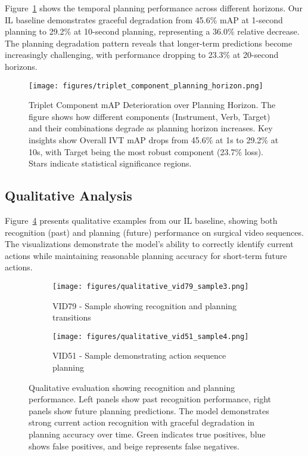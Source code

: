 \documentclass[runningheads]{llncs}
\begin{document}
Figure~\ref{fig:planning_analysis} shows the temporal planning performance across different horizons. Our IL baseline demonstrates graceful degradation from 45.6\% mAP at 1-second planning to 29.2\% at 10-second planning, representing a 36.0\% relative decrease. The planning degradation pattern reveals that longer-term predictions become increasingly challenging, with performance dropping to 23.3\% at 20-second horizons.

\begin{figure}[h]
\centering
\texttt{[image: figures/triplet\_component\_planning\_horizon.png]}
\caption{Triplet Component mAP Deterioration over Planning Horizon. The figure shows how different components (Instrument, Verb, Target) and their combinations degrade as planning horizon increases. Key insights show Overall IVT mAP drops from 45.6\% at 1s to 29.2\% at 10s, with Target being the most robust component (23.7\% loss). Stars indicate statistical significance regions.}
\label{fig:planning_analysis}
\end{figure}

\subsection{Qualitative Analysis}

Figure~\ref{fig:qualitative_examples} presents qualitative examples from our IL baseline, showing both recognition (past) and planning (future) performance on surgical video sequences. The visualizations demonstrate the model's ability to correctly identify current actions while maintaining reasonable planning accuracy for short-term future actions.

\begin{figure}[h]
\centering
\begin{subfigure}{0.48\textwidth}
    \centering
    \texttt{[image: figures/qualitative\_vid79\_sample3.png]}
    \caption{VID79 - Sample showing recognition and planning transitions}
    \label{fig:qual_vid79}
\end{subfigure}
\hfill
\begin{subfigure}{0.48\textwidth}
    \centering
    \texttt{[image: figures/qualitative\_vid51\_sample4.png]}
    \caption{VID51 - Sample demonstrating action sequence planning}
    \label{fig:qual_vid51}
\end{subfigure}
\caption{Qualitative evaluation showing recognition and planning performance. Left panels show past recognition performance, right panels show future planning predictions. The model demonstrates strong current action recognition with graceful degradation in planning accuracy over time. Green indicates true positives, blue shows false positives, and beige represents false negatives.}
\label{fig:qualitative_examples}
\end{figure}
\end{document}
